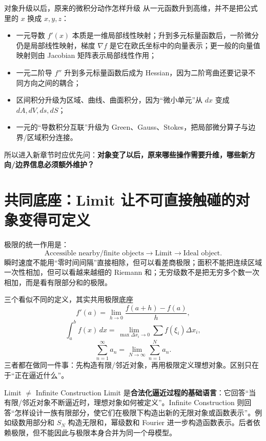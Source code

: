 \documentclass[11pt,a4paper,openany]{ctexbook}
\newcommand{\key}[1]{\textbf{\color{deep}#1}}
\begin{document}
\begin{corebox}{对象升级以后，原来的微积分动作怎样升级}
从一元函数升到高维，并不是把公式里的 $x$ 换成 $x,y,z$：
\begin{itemize}
  \item 一元导数 $f'(x)$ 本质是一维局部线性映射；升到多元标量函数后，一阶微分仍是局部线性映射，梯度 $\nabla f$ 是它在欧氏坐标中的向量表示；更一般的向量值映射则由 Jacobian 矩阵表示局部线性作用；
  \item 一元二阶导 $f''$ 升到多元标量函数后成为 Hessian，因为二阶弯曲还要记录不同方向之间的耦合；
  \item 区间积分升级为区域、曲线、曲面积分，因为“微小单元”从 $dx$ 变成 $dA,dV,ds,dS$；
  \item 一元的“导数积分互联”升级为 Green、Gauss、Stokes，把局部微分算子与边界/区域积分连接。
\end{itemize}
所以进入新章节时应优先问：\key{对象变了以后，原来哪些操作需要升维，哪些新方向/边界信息必须额外维护？}
\end{corebox}

\section{共同底座：Limit 让不可直接触碰的对象变得可定义}
极限的统一作用是：
\[
\boxed{\text{Accessible nearby/finite objects}\to\text{Limit}\to\text{Ideal object}}.
\]
瞬时速度不能用“零时间间隔”直接相除，但可以看差商极限；面积不能把连续区域一次性相加，但可以看越来越细的 Riemann 和；无穷级数不是把无穷多个数一次相加，而是看有限部分和的极限。

\begin{examplebox}{三个看似不同的定义，其实共用极限底座}
\[
f'(a)=\lim_{h\to0}\frac{f(a+h)-f(a)}{h},
\]
\[
\int_a^b f(x)\,dx=\lim_{\max\Delta x_i\to0}\sum f(\xi_i)\Delta x_i,
\]
\[
\sum_{n=1}^{\infty}a_n=\lim_{N\to\infty}\sum_{n=1}^{N}a_n.
\]
三者都在做同一件事：先构造有限/邻近对象，再用极限定义理想对象。区别只在于“正在逼近什么”。
\end{examplebox}

\begin{boundarybox}{Limit $\neq$ Infinite Construction}
Limit 是\key{合法化逼近过程的基础语言}：它回答“当有限/邻近对象不断逼近时，理想对象如何被定义”。Infinite Construction 则回答“怎样设计一族有限部分，使它们在极限下构造出新的无限对象或函数表示”。例如级数用部分和 $S_N$ 构造无限和，幂级数和 Fourier 进一步构造函数表示。后者依赖极限，但不能因此与极限本身合并为同一个母模型。
\end{boundarybox}
\end{document}
